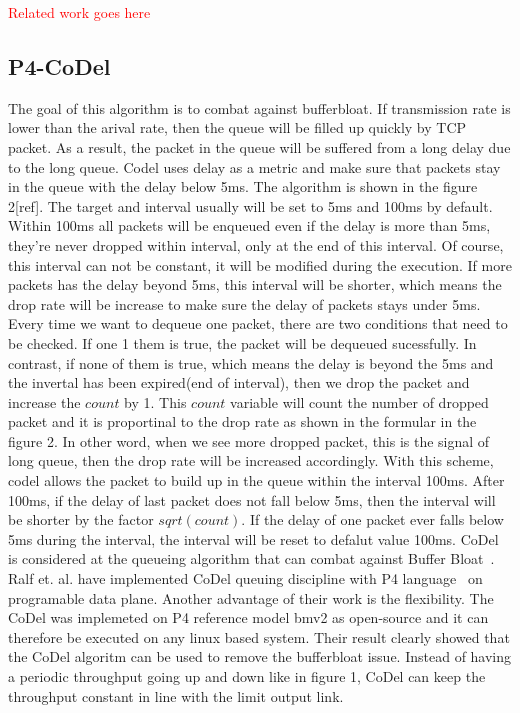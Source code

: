 \textcolor{red}{Related work goes here}
\subsection{P4-CoDel}
The goal of this algorithm is to combat against bufferbloat. If transmission rate is lower than the arival rate, then the queue will be filled up quickly by TCP packet. As a result, the packet in the queue will be suffered from a long delay due to the long queue. Codel uses delay as a metric and make sure that packets stay in the queue with the delay below 5ms. The algorithm is shown in the figure 2[ref]. The target and interval usually will be set to 5ms and 100ms by default. Within 100ms all packets will be enqueued even if the delay is more than 5ms, they're never dropped within interval, only at the end of this interval. Of course, this interval can not be constant, it will be modified during the execution. If more packets has the delay beyond 5ms, this interval will be shorter, which means the drop rate will be increase to make sure the delay of packets stays under 5ms. Every time we want to dequeue one packet, there are two conditions that need to be checked. If one 1 them is true, the packet will be dequeued sucessfully. In contrast, if none of them is true, which means the delay is beyond the 5ms and the invertal has been expired(end of interval), then we drop the packet and increase the $count$ by 1. This $count$ variable will count the number of dropped packet and it is proportinal to the drop rate as shown in the formular in the figure 2. In other word, when we see more dropped packet, this is the signal of long queue, then the drop rate will be increased accordingly. With this scheme, codel allows the packet to build up in the queue within the interval 100ms. After 100ms, if the delay of last packet does not fall below 5ms, then the interval will be shorter by the factor $sqrt(count)$. If the delay of one packet ever falls below 5ms during the interval, the interval will be reset to defalut value 100ms. CoDel~\cite{nichols2013controlled} is considered at the queueing algorithm that can combat against Buffer Bloat~\cite{gettys2012bufferbloat}. Ralf et. al. have implemented CoDel queuing discipline with P4 language~\cite{bosshart2014p4} on programable data plane. Another advantage of their work is the flexibility. The CoDel was implemeted on P4 reference model bmv2 as open-source and it can therefore be executed on any linux based system. Their result clearly showed that the CoDel algoritm can be used to remove the bufferbloat issue. Instead of having a periodic throughput going up and down like in figure 1, CoDel can keep the throughput constant in line with the limit output link.  
